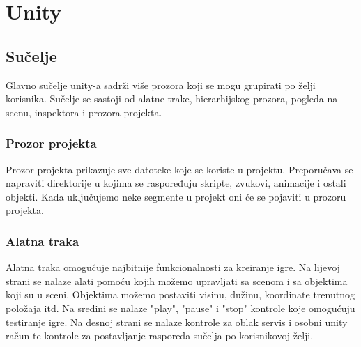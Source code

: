 \section{Unity}
\subsection{Sučelje}
Glavno sučelje unity-a sadrži više prozora koji se mogu grupirati po želji korisnika. Sučelje se sastoji od alatne trake, hierarhijskog prozora, pogleda na scenu, inspektora i prozora projekta.

\subsubsection{Prozor projekta}
Prozor projekta prikazuje sve datoteke koje se koriste u projektu. Preporučava se napraviti direktorije u kojima se raspoređuju skripte, zvukovi, animacije i ostali objekti. Kada uključujemo neke segmente u projekt oni će se pojaviti u prozoru projekta.


\subsubsection{Alatna traka}
Alatna traka omogućuje najbitnije funkcionalnosti za kreiranje igre. Na lijevoj strani se nalaze alati pomoću kojih možemo upravljati sa scenom i sa objektima koji su u sceni. Objektima možemo postaviti visinu, dužinu, koordinate trenutnog položaja itd. Na sredini se nalaze "play", "pause" i "stop" kontrole koje omogućuju testiranje igre. Na desnoj strani se nalaze kontrole za oblak servis i osobni unity račun te kontrole za postavljanje rasporeda sučelja po korisnikovoj želji.


